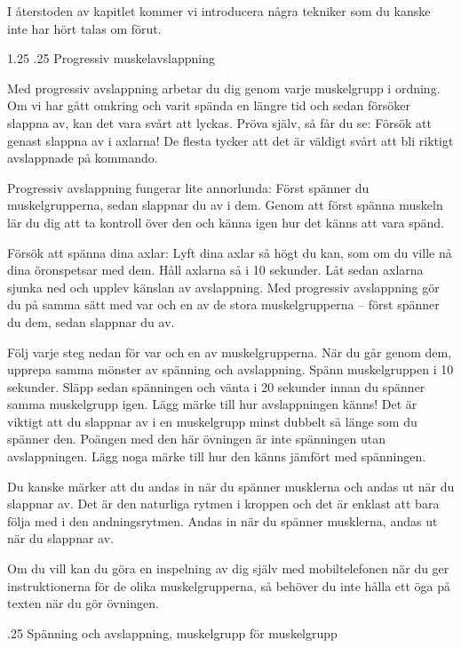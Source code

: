\documentclass[swedish,a4paper]{book}
\makeatletter
\renewcommand\section{\@startsection{section}{1}{\z@}%
                                   {1.25\baselineskip}%
                                   {.25\baselineskip}%
                                   {\fontsize{1.25\baselineskip}{1.25\baselineskip}\selectfont\sffamily\bfseries}} %
\renewcommand\subsection{\@startsection{subsection}{1}{\z@}%
                                   {\baselineskip}%
                                   {.25\baselineskip}%
                                   {\fontsize{1\baselineskip}{1.25\baselineskip}\selectfont\sffamily\bfseries}} %
\makeatother
\begin{document}
I återstoden av kapitlet kommer vi introducera några tekniker som du kanske inte har hört talas om förut.

\section{Progressiv muskelavslappning}

Med progressiv avslappning arbetar du dig genom varje muskelgrupp i ordning. Om vi har gått omkring och varit spända en längre tid och sedan försöker slappna av, kan det vara svårt att lyckas. Pröva själv, så får du se: Försök att genast slappna av i axlarna! De flesta tycker att det är väldigt svårt att bli riktigt avslappnade på kommando.

Progressiv avslappning fungerar lite annorlunda: Först spänner du muskelgrupperna, sedan slappnar du av i dem. Genom att först spänna muskeln lär du dig att ta kontroll över den och känna igen hur det känns att vara spänd. 

Försök att spänna dina axlar: Lyft dina axlar så högt du kan, som om du ville nå dina öronspetsar med dem. Håll axlarna så i 10 sekunder. Låt sedan axlarna sjunka ned och upplev känslan av avslappning. Med progressiv avslappning gör du på samma sätt med var och en av de stora muskelgrupperna -- först spänner du dem, sedan slappnar du av.

Följ varje steg nedan för var och en av muskelgrupperna. När du går genom dem, upprepa samma mönster av spänning och avslappning. Spänn muskelgruppen i 10 sekunder. Släpp sedan spänningen och vänta i 20 sekunder innan du spänner samma muskelgrupp igen. Lägg märke till hur avslappningen känns! Det är viktigt att du slappnar av i en muskelgrupp minst dubbelt så länge som du spänner den. Poängen med den här övningen är inte spänningen utan avslappningen. Lägg noga märke till hur den känns jämfört med spänningen.

Du kanske märker att du andas in när du spänner musklerna och andas ut när du slappnar av. Det är den naturliga rytmen i kroppen och det är enklast att bara följa med i den andningsrytmen. Andas in när du spänner musklerna, andas ut när du slappnar av. 

Om du vill kan du göra en inspelning av dig själv med mobiltelefonen när du ger instruktionerna för de olika muskelgrupperna, så behöver du inte hålla ett öga på texten när du gör övningen.

\subsection{Spänning och avslappning, muskelgrupp för muskelgrupp}
\end{document}
